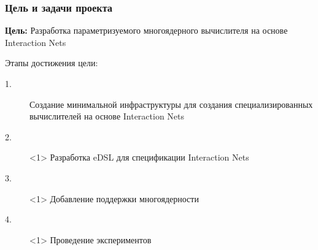 \documentclass[aspectratio=169]{beamer}
\begin{document}
\begin{frame}
    \frametitle{Цель и задачи проекта}

    \textbf{Цель:} Разработка параметризуемого многоядерного вычислителя на основе Interaction Nets

    \vspace{2em}

    Этапы достижения цели:
    \begin{description}
        \item[ 1.] Создание минимальной инфраструктуры для создания специализированных вычислителей на основе Interaction Nets
        \item[2.]<1> Разработка eDSL для спецификации Interaction Nets
        \item[3.]<1> Добавление поддержки многоядерности
        \item[4.]<1> Проведение экспериментов
    \end{description}


\end{frame}
\end{document}
